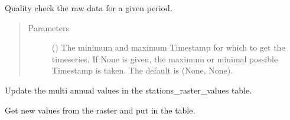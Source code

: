 \documentclass[letterpaper,10pt,english]{sphinxmanual}
\begin{document}
\begin{fulllineitems}

\begin{fulllineitems}
\label{\detokenize{weatherDB:weatherDB.station.StationBase.quality_check}}
\sphinxAtStartPar
Quality check the raw data for a given period.
\begin{quote}\begin{description}
\item[{Parameters}] \leavevmode
\sphinxAtStartPar
{} (\sphinxstyleliteralemphasis{\sphinxupquote{, }}) \textendash{} The minimum and maximum Timestamp for which to get the timeseries.
If None is given, the maximum or minimal possible Timestamp is taken.
The default is (None, None).

\end{description}\end{quote}

\end{fulllineitems}


\begin{fulllineitems}
\label{\detokenize{weatherDB:weatherDB.station.StationBase.update_ma}}
\sphinxAtStartPar
Update the multi annual values in the stations\_raster\_values table.

\sphinxAtStartPar
Get new values from the raster and put in the table.

\end{fulllineitems}



\end{fulllineitems}
\end{document}
